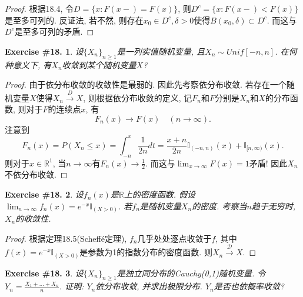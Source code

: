 \documentclass[UTF8, a4paper]{article}
\newtheorem{exercise}{Exercise \#18.}
\begin{document}
\begin{proof}
根据18.4, 令\(D = \{x : F(x - ) = F(x)\}\), 则\(D^c = \{x : F(x - ) < F(x)\}\)是至多可列的.
反证法, 若不然, 则存在\(x_0 \in D^c, \delta > 0\)使得\(B(x_0, \delta) \subset D^c\). 而这与\(D^c\)是至多可列的矛盾.

\end{proof}


\begin{framed}
\begin{exercise}
设\(\{X_n\}_{n\geq 1 }\)是一列实值随机变量, 且\(X_n \sim Unif[-n,n]\).
在何种意义下, 有\(X_n\)收敛到某个随机变量\(X\)?
\end{exercise}
\end{framed}

\begin{proof}
由于依分布收敛的收敛性是最弱的. 因此先考察依分布收敛.
若存在一个随机变量\(X\)使得\(X_n \xrightarrow{D} X\),
则根据依分布收敛的定义, 记\(F_n\)和\(F\)分别是\(X_n\)和\(X\)的分布函数, 则对于\(F\)的连续点\(x\), 有
$$
F_n(x) \to F(x) \quad (n \to \infty).
$$
注意到
$$
F_n(x) = P(X_n \leq x) = \int_{-n}^{x} \frac{1}{2n} d t = \frac{x+n}{2n} \mathbb{I}_{(-n, n)}(x) + \mathbb{I}_{[n, \infty)}(x).
$$
则对于\(x \in \mathbb{R}^1\), 当\(n\to\infty\)有\(F_n(x) \to \frac{1}{2}\).
而这与\(\lim_{x\to\infty} F(x) = 1\)矛盾! 因此\(X_n\)不依分布收敛.
\end{proof}


\begin{framed}
\begin{exercise}
设\(f_n(x)\)是\(\mathbb{R}\)上的密度函数. 假设\(\lim_{n\to\infty} f_n(x) = e^{-x}\mathbb{I}_{(X>0)}\).
若\(f_n\)是随机变量\(X_n\)的密度. 考察当\(n\)趋于无穷时, \(X_n\)的收敛性.
\end{exercise}
\end{framed}

\begin{proof}
根据定理18.5(Scheff\'{e}定理), \(f_n\)几乎处处逐点收敛于\(f\), 其中\(f(x) = e^{-x}\mathbb{I}_{(X>0)}\)是参数为1的指数分布的密度函数.
则\(X_n \xrightarrow{\mathcal{D}} X\).
\end{proof}


\begin{framed}
\begin{exercise}
设\(\{X_n\}_{n\geq 1}\)是独立同分布的Cauchy(0,1)随机变量.
令\(Y_n = \frac{X_1 + ... + X_n}{n}\). 证明: \(Y_n\)依分布收敛, 并求出极限分布. \(Y_n\)是否也依概率收敛?
\end{exercise}
\end{framed}
\end{document}
